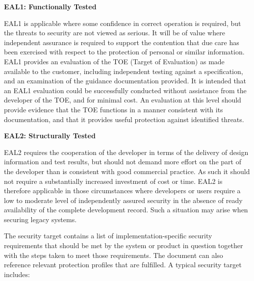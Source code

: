 \documentclass[10pt]{article}
\newcommand{\comm}[1]{{\leavevmode\color{gray}#1}}
\begin{document}
      \comm{
        \textbf{EAL1: Functionally Tested}

        EAL1 is applicable where some confidence in correct operation is
        required, but the threats to security are not viewed as serious. It
        will be of value where independent assurance is required to support the
        contention that due care has been exercised with respect to the
        protection of personal or similar information. EAL1 provides an
        evaluation of the TOE (Target of Evaluation) as made available to the
        customer, including independent testing against a specification, and an
        examination of the guidance documentation provided. It is intended that
        an EAL1 evaluation could be successfully conducted without assistance
        from the developer of the TOE, and for minimal cost. An evaluation at
        this level should provide evidence that the TOE functions in a manner
        consistent with its documentation, and that it provides useful
        protection against identified threats.

        \textbf{EAL2: Structurally Tested}

        EAL2 requires the cooperation of the developer in terms of the delivery
        of design information and test results, but should not demand more
        effort on the part of the developer than is consistent with good
        commercial practice. As such it should not require a substantially
        increased investment of cost or time.  EAL2 is therefore applicable in
        those circumstances where developers or users require a low to moderate
        level of independently assured security in the absence of ready
        availability of the complete development record. Such a situation may
        arise when securing legacy systems.
      }

        The security target contains a list of implementation-specific security
        requirements that should be met by the system or product in question
        together with the steps taken to meet those requirements. The document
        can also reference relevant protection profiles that are fulfilled.
         A typical security target includes:
\end{document}
